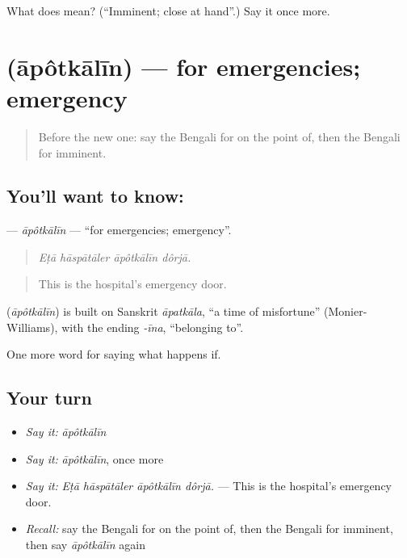 \begin{tcolorbox}[breakable,colback=teal!4,colframe=teal!35!black,title={Before you move on}]
What does  mean? (\textquotedblleft{}Imminent; close at hand\textquotedblright{}.) Say it once more.
\end{tcolorbox}
\section[\texorpdfstring{\bn{আপৎকালীন} (āpôtkālīn)}{আপৎকালীন (āpôtkālīn)}]{ (āpôtkālīn) — for emergencies; emergency}

\label{lesson:BN-C538-apotkalin}



\begin{quote}
Before the new one: say the Bengali for on the point of, then the Bengali for imminent.
\end{quote}

\subsection*{You'll want to know: }
\textbf{} — \emph{āpôtkālīn} — \textquotedblleft{}for emergencies; emergency\textquotedblright{}.

\begin{quote}
   
\end{quote}

\begin{quote}
\emph{Eṭā hāspātāler āpôtkālīn dôrjā.}
\end{quote}

\begin{quote}
This is the hospital's emergency door.
\end{quote}

\begin{cousinweb}
\textbf{} (\emph{āpôtkālīn}) is built on Sanskrit \emph{āpatkāla}, \textquotedblleft{}a time of misfortune\textquotedblright{} (Monier-Williams), with the ending \emph{-īna}, \textquotedblleft{}belonging to\textquotedblright{}.
\end{cousinweb}

\begin{grammarlens}[title={What you've built}]
One more word for saying what happens if.
\end{grammarlens}

\subsection*{Your turn}
\begin{itemize}
\raggedright
  \item \emph{Say it:} \emph{āpôtkālīn}
  \item \emph{Say it:} \emph{āpôtkālīn}, once more
  \item \emph{Say it:} \emph{Eṭā hāspātāler āpôtkālīn dôrjā.} — This is the hospital's emergency door.
  \item \emph{Recall:} say the Bengali for on the point of, then the Bengali for imminent, then say \emph{āpôtkālīn} again
\end{itemize}

